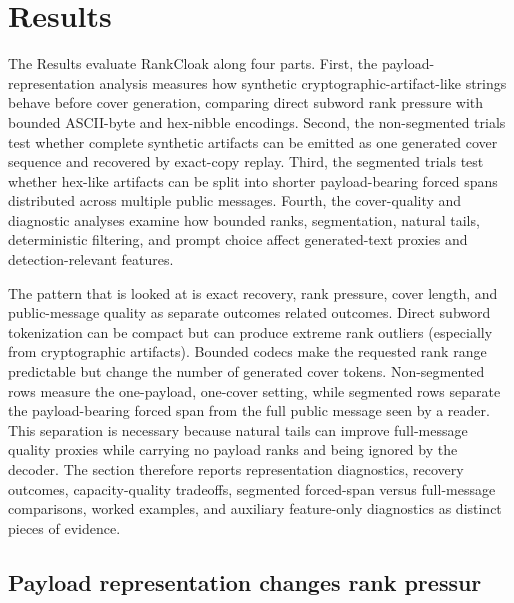 \documentclass[fleqn,10pt]{wlscirep}
\begin{document}
\section*{Results}

The Results evaluate RankCloak along four parts. First, the payload-representation analysis measures how synthetic cryptographic-artifact-like strings behave before cover generation, comparing direct subword rank pressure with bounded ASCII-byte and hex-nibble encodings. Second, the non-segmented trials test whether complete synthetic artifacts can be emitted as one generated cover sequence and recovered by exact-copy replay. Third, the segmented trials test whether hex-like artifacts can be split into shorter payload-bearing forced spans distributed across multiple public messages. Fourth, the cover-quality and diagnostic analyses examine how bounded ranks, segmentation, natural tails, deterministic filtering, and prompt choice affect generated-text proxies and detection-relevant features.

The pattern that is looked at is exact recovery, rank pressure, cover length, and public-message quality as separate outcomes related outcomes. Direct subword tokenization can be compact but can produce extreme rank outliers (especially from cryptographic artifacts). Bounded codecs make the requested rank range predictable but change the number of generated cover tokens. Non-segmented rows measure the one-payload, one-cover setting, while segmented rows separate the payload-bearing forced span from the full public message seen by a reader. This separation is necessary because natural tails can improve full-message quality proxies while carrying no payload ranks and being ignored by the decoder. The section therefore reports representation diagnostics, recovery outcomes, capacity-quality tradeoffs, segmented forced-span versus full-message comparisons, worked examples, and auxiliary feature-only diagnostics as distinct pieces of evidence.


\subsection*{Payload representation changes rank pressur}
\end{document}

